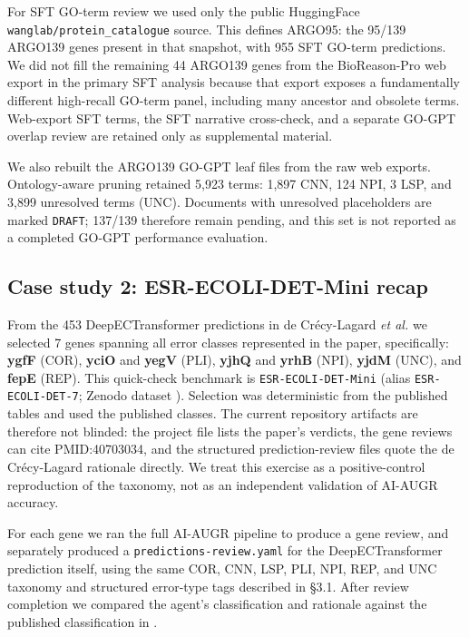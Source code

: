 \documentclass[
  11pt,
]{article}
\begin{document}
For SFT GO-term review we used only the public HuggingFace
\texttt{wanglab/protein\_catalogue} source. This defines ARGO95: the
95/139 ARGO139 genes present in that snapshot, with 955 SFT GO-term
predictions. We did not fill the remaining 44 ARGO139 genes from the
BioReason-Pro web export in the primary SFT analysis because that export
exposes a fundamentally different high-recall GO-term panel, including
many ancestor and obsolete terms. Web-export SFT terms, the SFT narrative
cross-check, and a separate GO-GPT overlap review are retained only as
supplemental material.

We also rebuilt the ARGO139 GO-GPT leaf files from the raw web exports.
Ontology-aware pruning retained 5,923 terms: 1,897 CNN, 124 NPI, 3 LSP,
and 3,899 unresolved terms (UNC). Documents with unresolved placeholders are
marked \texttt{DRAFT}; 137/139 therefore remain pending, and this set is not
reported as a completed GO-GPT performance evaluation.

\hypertarget{case-study-2-esr-ecoli-det-mini-recap}{%
\subsection{Case study 2: ESR-ECOLI-DET-Mini
recap}\label{case-study-2-esr-ecoli-det-mini-recap}}

From the 453 DeepECTransformer predictions in de Crécy-Lagard \emph{et
al.} \cite{decrecylagard2025} we selected 7 genes spanning all error classes represented
in the paper, specifically: \textbf{ygfF} (COR), \textbf{yciO} and
\textbf{yegV} (PLI), \textbf{yjhQ} and \textbf{yrhB} (NPI),
\textbf{yjdM} (UNC), and \textbf{fepE} (REP). This quick-check benchmark
is \texttt{ESR-ECOLI-DET-Mini} (alias \texttt{ESR-ECOLI-DET-7};
Zenodo dataset \cite{mungall2026esrecolidetmini}). Selection was
deterministic from the published tables and used the published classes. The current
repository artifacts are therefore not blinded: the project file lists
the paper's verdicts, the gene reviews can cite PMID:40703034, and the
structured prediction-review files quote the de Crécy-Lagard rationale
directly. We treat this exercise as a positive-control reproduction of
the taxonomy, not as an independent validation of AI-AUGR accuracy.

For each gene we ran the full AI-AUGR pipeline to produce a gene review,
and separately produced a \texttt{predictions-review.yaml} for the
DeepECTransformer prediction itself, using the same COR, CNN, LSP, PLI,
NPI, REP, and UNC taxonomy and structured error-type tags described in
§3.1. After review completion we compared the agent's classification
and rationale against the published classification in
\cite{decrecylagard2025}.
\end{document}
